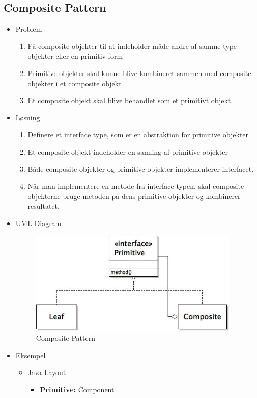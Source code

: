 \documentclass{article}
\begin{document}
\subsection{Composite Pattern}
\begin{itemize}
	\item Problem
	\begin{enumerate}
		\item Få composite objekter til at indeholder måde andre af samme type objekter eller en primitiv form
		\item Primitive objekter skal kunne blive kombineret sammen med composite objekter i et composite objekt
		\item Et composite objekt skal blive behandlet som et primitivt objekt.
	\end{enumerate}
	\item Løsning
	\begin{enumerate}
		\item Definere et interface type, som er en abstraktion for primitive objekter
		\item Et composite objekt indeholder en samling af primitive objekter
		\item Både composite objekter og primitive objekter implementerer interfacet. 
		\item Når man implementere en metode fra interface typen, skal composite objekterne bruge metoden på dens primitive objekter og kombinerer resultatet.
	\end{enumerate}
	\item UML Diagram
	\begin{figure}[ht!]
		\centering
		\includegraphics[width=100mm]{img/compositeUML.jpeg}
		\caption{Composite Pattern  \label{UMLDesign1}}
	\end{figure}
	\item Eksempel
	\begin{itemize}
		\item Java Layout
		\begin{itemize}
			\item \textbf{Primitive:} Component 

\end{itemize}
\end{itemize}
\end{itemize}
\end{document}
